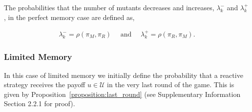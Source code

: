 \documentclass[11pt]{article}
\theoremstyle{plainCl1}
\theoremstyle{plainCl2}
\begin{document}
The probabilities that the number of mutants decreases and increases,
\(\lambda^-_k\) and \(\lambda^+_k\), in the perfect memory case are defined as,

\begin{align}\label{eq:perfect_memory_lambdas}
  \lambda^-_k \!=\!\rho(\pi_M, \pi_R) \quad \text{ and } \quad \lambda^+_k \!=\!\rho(\pi_R, \pi_M).
\end{align}

\subsubsection*{Limited Memory}

In this case of limited memory we initially define the probability that a
reactive strategy receives the payoff $u\!\in\! \mathcal{U}$ in the very last
round of the game. This is given by Proposition~\ref{proposition:last_round}
(see Supplementary Information Section 2.2.1 for proof).
\end{document}
